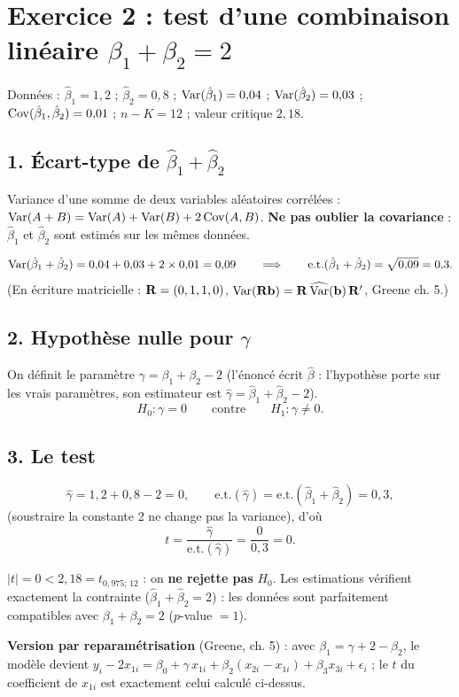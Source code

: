\documentclass[11pt,a4paper]{article}
\begin{document}
\section{Exercice 2 : test d'une combinaison linéaire $\beta_1+\beta_2=2$}

Données : $\hat\beta_1=1{,}2$ ; $\hat\beta_2=0{,}8$ ; $\operatorname{Var}(\hat\beta_1)=0{,}04$ ; $\operatorname{Var}(\hat\beta_2)=0{,}03$ ; $\operatorname{Cov}(\hat\beta_1,\hat\beta_2)=0{,}01$ ; $n-K=12$ ; valeur critique $2{,}18$.

\subsection*{1. Écart-type de $\hat\beta_1+\hat\beta_2$}

\begin{idee}
Variance d'une somme de deux variables aléatoires corrélées : $\operatorname{Var}(A+B)=\operatorname{Var}(A)+\operatorname{Var}(B)+2\operatorname{Cov}(A,B)$. \textbf{Ne pas oublier la covariance} : $\hat\beta_1$ et $\hat\beta_2$ sont estimés sur les mêmes données.
\end{idee}
\[
\operatorname{Var}(\hat\beta_1+\hat\beta_2)=0{,}04+0{,}03+2\times0{,}01=0{,}09
\qquad\Longrightarrow\qquad
\text{e.t.}(\hat\beta_1+\hat\beta_2)=\sqrt{0{,}09}=0{,}3 .
\]
(En écriture matricielle : $\mathbf{R}=(0,1,1,0)$, $\operatorname{Var}(\mathbf{R}\mathbf{b})=\mathbf{R}\,\widehat{\operatorname{Var}}(\mathbf{b})\,\mathbf{R}'$, Greene ch. 5.)

\subsection*{2. Hypothèse nulle pour $\gamma$}
On définit le paramètre $\gamma=\beta_1+\beta_2-2$ (l'énoncé écrit $\hat\beta$ : l'hypothèse porte sur les vrais paramètres, son estimateur est $\hat\gamma=\hat\beta_1+\hat\beta_2-2$).
\[
H_0:\gamma=0\qquad\text{contre}\qquad H_1:\gamma\neq0 .
\]

\subsection*{3. Le test}
\[
\hat\gamma=1{,}2+0{,}8-2=0,\qquad \text{e.t.}(\hat\gamma)=\text{e.t.}(\hat\beta_1+\hat\beta_2)=0{,}3,
\]
(soustraire la constante 2 ne change pas la variance), d'où
\[
t=\frac{\hat\gamma}{\text{e.t.}(\hat\gamma)}=\frac{0}{0{,}3}=0 .
\]

\begin{reponse}
$|t|=0<2{,}18=t_{0{,}975;\,12}$ : on \textbf{ne rejette pas} $H_0$. Les estimations vérifient exactement la contrainte ($\hat\beta_1+\hat\beta_2=2$) : les données sont parfaitement compatibles avec $\beta_1+\beta_2=2$ ($p$-value $=1$).

\textbf{Version par reparamétrisation} (Greene, ch. 5) : avec $\beta_1=\gamma+2-\beta_2$, le modèle devient
$y_i-2x_{1i}=\beta_0+\gamma\,x_{1i}+\beta_2(x_{2i}-x_{1i})+\beta_3x_{3i}+\epsilon_i$ ; le $t$ du coefficient de $x_{1i}$ est exactement celui calculé ci-dessus.
\end{reponse}
\end{document}

